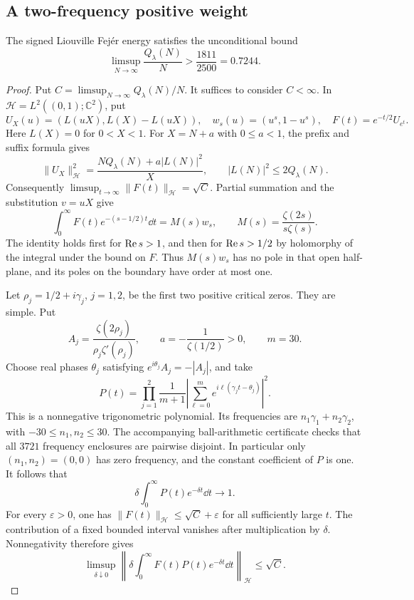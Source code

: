 \subsection{A two-frequency positive weight}
\label{ssec:fejer-two-frequency}

\begin{proposition}\label{prop:fejer-two-frequency}
The signed Liouville Fej\'er energy satisfies the unconditional bound
\[
 \limsup_{N\to\infty}\frac{Q_\lambda(N)}N
       >\frac{1811}{2500}=0.7244.
\]
\end{proposition}

\begin{proof}
Put \(C=\limsup_{N\to\infty}Q_\lambda(N)/N\). It suffices to
consider \(C<\infty\). In
\(\mathcal H=L^2((0,1);\mathbb C^2)\), put
\[
 U_X(u)=(L(uX),L(X)-L(uX)),\quad
 w_s(u)=(u^s,1-u^s),\quad F(t)=e^{-t/2}U_{e^t}.
\]
Here \(L(X)=0\) for \(0<X<1\). For \(X=N+a\) with
\(0\le a<1\), the prefix and suffix formula gives
\[
 \|U_X\|_{\mathcal H}^2
    =\frac{NQ_\lambda(N)+a|L(N)|^2}{X},\qquad
 |L(N)|^2\le2Q_\lambda(N).
\]
Consequently \(\limsup_{t\to\infty}\|F(t)\|_{\mathcal H}=\sqrt C\).
Partial summation and the substitution \(v=uX\) give
\[
 \int_0^\infty F(t)e^{-(s-1/2)t}\dd t
   =M(s)w_s,\qquad M(s)=\frac{\zeta(2s)}{s\zeta(s)}.
\]
The identity holds first for \(\operatorname{Re} s>1\), and then for
\(\operatorname{Re} s>1/2\) by holomorphy of the integral under the bound
on \(F\). Thus \(M(s)w_s\) has no pole in that open
half-plane, and its poles on the boundary have order at most one.

Let \(\rho_j=1/2+i\gamma_j\), \(j=1,2\), be the first two
positive critical zeros. They are simple. Put
\[
 A_j=\frac{\zeta(2\rho_j)}{\rho_j\zeta'(\rho_j)},\qquad
 a=-\frac1{\zeta(1/2)}>0,\qquad m=30.
\]
Choose real phases \(\theta_j\) satisfying
\(e^{i\theta_j}A_j=-|A_j|\), and take
\[
 P(t)=\prod_{j=1}^{2}
    \frac1{m+1}\left|\sum_{\ell=0}^{m}
             e^{i\ell(\gamma_jt-\theta_j)}\right|^2.
\]
This is a nonnegative trigonometric polynomial. Its frequencies
are \(n_1\gamma_1+n_2\gamma_2\), with \(-30\le n_1,n_2\le30\).
The accompanying ball-arithmetic certificate checks that all
\(3721\) frequency enclosures are pairwise disjoint. In
particular only \((n_1,n_2)=(0,0)\) has zero frequency, and
the constant coefficient of \(P\) is one. It follows that
\[
 \delta\int_0^\infty P(t)e^{-\delta t}\dd t\longrightarrow1.
\]
For every \(\varepsilon>0\), one has
\(\|F(t)\|_{\mathcal H}\le\sqrt C+\varepsilon\) for all
sufficiently large \(t\). The contribution of a fixed bounded
interval vanishes after multiplication by \(\delta\).
Nonnegativity therefore gives
\[
 \limsup_{\delta\downarrow0}
   \left\|\delta\int_0^\infty
          F(t)P(t)e^{-\delta t}\dd t\right\|_{\mathcal H}
       \le\sqrt C.
\]


\end{proof}
